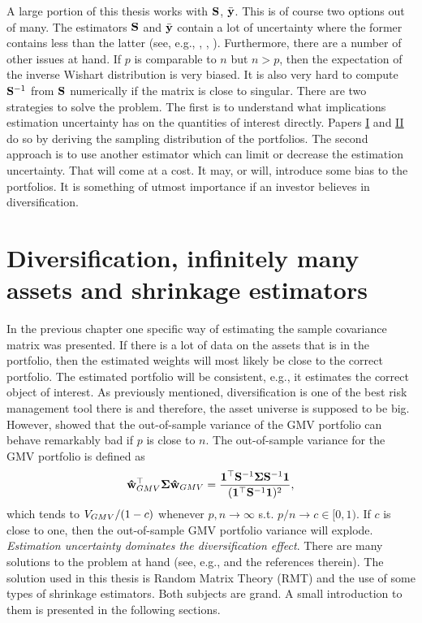 \documentclass[12pt, twoside]{book}\usepackage{knitr}
\begin{document}
A large portion of this thesis works with $\mathbf{S}$, $\bar{\mathbf{y}}$.
This is of course two options out of many.
The estimators $\mathbf{S}$ and $\bar{\mathbf{y}}$ contain a lot of uncertainty where the former contains less than the latter (see, e.g., \cite{frankfurter1971portfolio}, \citet{merton1980estimating}, \citet{best1991sensitivity}). 
Furthermore, there are a number of other issues at hand.
If $p$ is comparable to $n$ but $n>p$, then the expectation of the inverse Wishart distribution is very biased.
It is also very hard to compute $\mathbf{S}^{-1}$ from $\mathbf{S}$ numerically if the matrix is close to singular.
There are two strategies to solve the problem.
The first is to understand what implications estimation uncertainty has on the quantities of interest directly.
Papers \hyperref[sec:paper1]{I} and \hyperref[sec:paper2]{II} do so by deriving the sampling distribution of the portfolios.
The second approach is to use another estimator which can limit or decrease the estimation uncertainty.
That will come at a cost.
It may, or will, introduce some bias to the portfolios.
It is something of utmost importance if an investor believes in diversification.

\chapter{Diversification, infinitely many assets and shrinkage estimators}\label{ch:highdim}


In the previous chapter one specific way of estimating the sample covariance matrix was presented.
If there is a lot of data on the assets that is in the portfolio, then the estimated weights will most likely be close to the correct portfolio.
The estimated portfolio will be consistent, e.g., it estimates the correct object of interest. 
As previously mentioned, diversification is one of the best risk management tool there is and therefore, the asset universe is supposed to be big.
However, \citet{bodnar2016optimal} showed that the out-of-sample variance of the GMV portfolio can behave remarkably bad if $p$ is close to $n$.
The out-of-sample variance for the GMV portfolio is defined as 
\begin{equation}\label{eqn:oot_var}
  \mathbf{\hat{w}}_{GMV}^\top \mathbf{\Sigma} \mathbf{\hat{w}}_{GMV} = \frac{\mathbf{1}^\top \mathbf{S}^{-1} \mathbf{\Sigma} \mathbf{S}^{-1} \mathbf{1} }{(\mathbf{1}^\top \mathbf{S}^{-1} \mathbf{1})^2},
\end{equation}
which tends to $V_{GMV}/(1-c)$ whenever $p,n \rightarrow \infty$ s.t. $p/n \rightarrow c \in [0,1)$. 
If $c$ is close to one, then the out-of-sample GMV portfolio variance will explode. 
\textit{Estimation uncertainty dominates the diversification effect}.
There are many solutions to the problem at hand (see, e.g., \citet{lw17} and the references therein). 
The solution used in this thesis is Random Matrix Theory (RMT) and the use of some types of shrinkage estimators. 
Both subjects are grand.
A small introduction to them is presented in the following sections.
\end{document}

